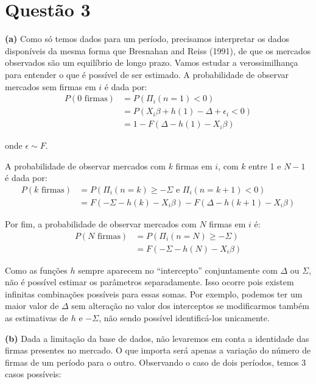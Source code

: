 \documentclass[
  12pt,
]{article}
\begin{document}
\hypertarget{questuxe3o-3}{%
\section{Questão 3}\label{questuxe3o-3}}

\textbf{(a)} Como só temos dados para um período, precisamos interpretar
os dados disponíveis da mesma forma que Bresnahan and Reiss (1991), de
que os mercados observados são um equilíbrio de longo prazo. Vamos
estudar a verossimilhança para entender o que é possível de ser
estimado. A probabilidade de observar mercados sem firmas em \(i\) é
dada por: \begin{align*}
    P(0 \text{ firmas}) &= P(\Pi_i(n=1) < 0)  \\        
  &= P(X_i\beta + h(1) - \Delta + \epsilon_i < 0) \\
  &= 1 - F(\Delta - h(1) - X_i\beta)
\end{align*}

onde \(\epsilon \sim F\).

A probabilidade de observar mercados com \(k\) firmas em \(i\), com
\(k\) entre 1 e \(N-1\) é dada por: \begin{align*}
    P(k \text{ firmas}) &= P(\Pi_i(n=k) \geq -\Sigma \text{ e } \Pi_i(n=k+1) < 0) \\        
  &= F(-\Sigma - h(k) - X_i\beta) - F(\Delta - h(k+1) - X_i\beta)
\end{align*}

Por fim, a probabilidade de observar mercados com \(N\) firmas em \(i\)
é: \begin{align*}
    P(N \text{ firmas}) &= P(\Pi_i(n=N) \geq -\Sigma) \\        
  &= F(-\Sigma - h(N) - X_i\beta)
\end{align*}

Como as funções \(h\) sempre aparecem no ``intercepto'' conjuntamente
com \(\Delta\) ou \(\Sigma\), não é possível estimar os parâmetros
separadamente. Isso ocorre pois existem infinitas combinações possíveis
para essas somas. Por exemplo, podemos ter um maior valor de \(\Delta\)
sem alteração no valor dos interceptos se modificarmos também as
estimativas de \(h\) e \(-\Sigma\), não sendo possível identificá-los
unicamente.

\textbf{(b)} Dada a limitação da base de dados, não levaremos em conta a
identidade das firmas presentes no mercado. O que importa será apenas a
variação do número de firmas de um período para o outro. Observando o
caso de dois períodos, temos 3 casos possíveis:
\end{document}
